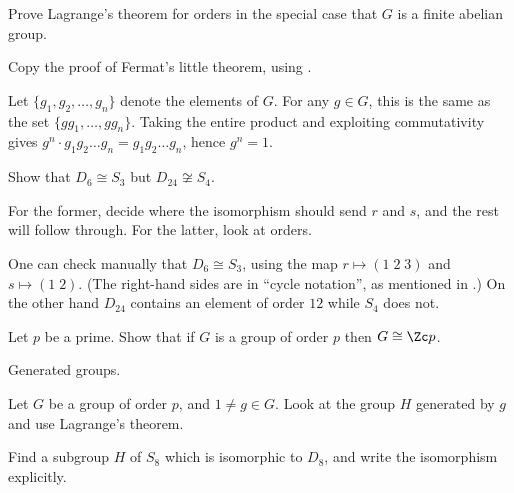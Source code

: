 \begin{problem}
	Prove Lagrange's theorem for orders in the special case
	that $G$ is a finite abelian group.
	\begin{hint}
		Copy the proof of Fermat's little theorem, using
		.
	\end{hint}
	\begin{sol}
		Let $\{g_1, g_2, \dots, g_n\}$ denote the elements of $G$.
		For any $g \in G$, this is the same as the set $\{gg_1, \dots, gg_n\}$.
		Taking the entire product and exploiting commutativity gives
		$g^n \cdot g_1g_2 \dots g_n = g_1g_2 \dots g_n$, hence $g^n=1$.
	\end{sol}
\end{problem}

\begin{problem}
	Show that $D_6 \cong S_3$ but $D_{24} \not\cong S_4$.
	\begin{hint}
		For the former,
		decide where the isomorphism should send $r$ and $s$,
		and the rest will follow through.
		For the latter, look at orders.
	\end{hint}
	\begin{sol}
		One can check manually that $D_6 \cong S_3$,
		using the map $r \mapsto (1 \; 2 \; 3)$ and $s \mapsto (1 \; 2)$.
		(The right-hand sides are in ``cycle notation'',
		as mentioned in \Cref{subsec:cycle_notation}.)
		On the other hand $D_{24}$ contains an element of order $12$
		while $S_4$ does not.
	\end{sol}
\end{problem}

\begin{sproblem}
	Let $p$ be a prime.
	Show that if $G$ is a group of order $p$ then $G \cong \Zc p$.
	\begin{hint}
		Generated groups.
	\end{hint}
	\begin{sol}
		Let $G$ be a group of order $p$, and $1 \neq g \in G$.
		Look at the group $H$ generated by $g$ and use Lagrange's theorem.
	\end{sol}
\end{sproblem}

\begin{problem}
	Find a subgroup $H$ of $S_8$
	which is isomorphic to $D_8$,
	and write the isomorphism explicitly.
\end{problem}

